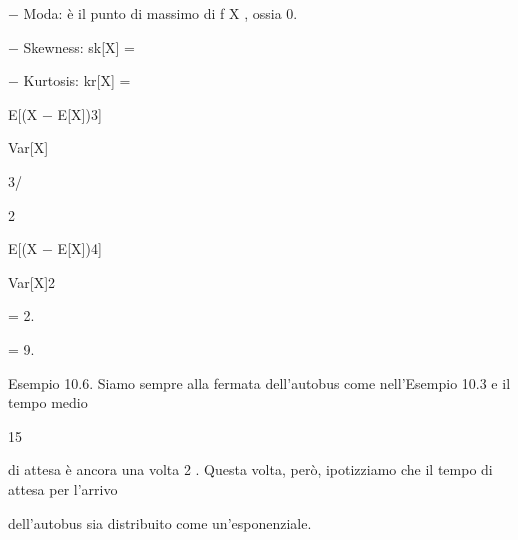 \documentclass[a4paper,portrait,12pt]{article}
\begin{document}
\begin{flushleft}
$-$ Moda: \`{e} il punto di massimo di f X , ossia 0.
\end{flushleft}


\begin{flushleft}
$-$ Skewness: sk[X] =
\end{flushleft}


\begin{flushleft}
$-$ Kurtosis: kr[X] =
\end{flushleft}





\begin{flushleft}
E[(X $-$ E[X])3]
\end{flushleft}


\begin{flushleft}
Var[X]
\end{flushleft}





3/


2





\begin{flushleft}
E[(X $-$ E[X])4]
\end{flushleft}


\begin{flushleft}
Var[X]2
\end{flushleft}





= 2.





= 9.





\begin{flushleft}
Esempio 10.6. Siamo sempre alla fermata dell'autobus come nell'Esempio 10.3 e il tempo medio
\end{flushleft}


15


\begin{flushleft}
di attesa \`{e} ancora una volta 2 . Questa volta, per\`{o}, ipotizziamo che il tempo di attesa per l'arrivo
\end{flushleft}


\begin{flushleft}
dell'autobus sia distribuito come un'esponenziale.
\end{flushleft}
\end{document}
